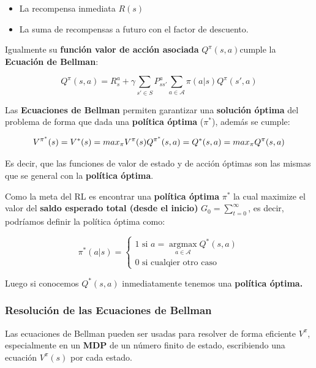 \documentclass[
  a4paper,
  DIV=11,
  numbers=noendperiod]{scrreprt}
\providecommand{\tightlist}{%
  \setlength{\itemsep}{0pt}\setlength{\parskip}{0pt}}\usepackage{longtable,booktabs,array}
\begin{document}
\begin{itemize}
\tightlist
\item
  La recompensa inmediata \(R(s)\)
\item
  La suma de recompensas a futuro con el factor de descuento.
\end{itemize}

Igualmente su \textbf{función valor de acción asociada}
\(Q^\pi(s,a)\)cumple la \textbf{Ecuación de Bellman}:

\[
Q^\pi(s,a) = R_s^a+\gamma \sum_{s'\in S} P_{ss'}^{a}\sum_{a \in \mathcal A} \pi (a|s)Q^\pi(s',a)
\]

Las \textbf{Ecuaciones de Bellman} permiten garantizar una
\textbf{solución óptima} del problema de forma que dada una
\textbf{política óptima} (\(\pi^*\)), además se cumple:

\[
V^{\pi^*}(s)=V^*(s)=max_\pi V^\pi(s)\\
Q^{\pi^*}(s,a)=Q^*(s,a)=max_\pi Q^\pi(s,a)
\]

Es decir, que las funciones de valor de estado y de acción óptimas son
las mismas que se general con la \textbf{política óptima}.

Como la meta del RL es encontrar una \textbf{política óptima} \(\pi^*\)
la cual maximize el valor del \textbf{saldo esperado total (desde el
inicio)} \(G_0=\sum_{t=0}^\infty\), es decir, podríamos definir la
política óptima como:

\begin{equation}
\pi^*(a|s)= \left\lbrace
\begin{array}{ll}
1 \text{ si } a=\mathop{\mathrm{argmax}}\limits_{a \in \mathcal A} Q^* (s,a) \\
0 \text{ si cualqier otro caso} 
\end{array}
\right.
\end{equation}

Luego si conocemos \(Q^*(s,a)\) inmediatamente tenemos una
\textbf{política óptima.}

\hypertarget{resoluciuxf3n-de-las-ecuaciones-de-bellman}{%
\subsubsection{Resolución de las Ecuaciones de
Bellman}\label{resoluciuxf3n-de-las-ecuaciones-de-bellman}}

Las ecuaciones de Bellman pueden ser usadas para resolver de forma
eficiente \(V^\pi\), especialmente en un \textbf{MDP} de un número
finito de estado, escribiendo una ecuación \(V^\pi (s)\) por cada
estado.
\end{document}
